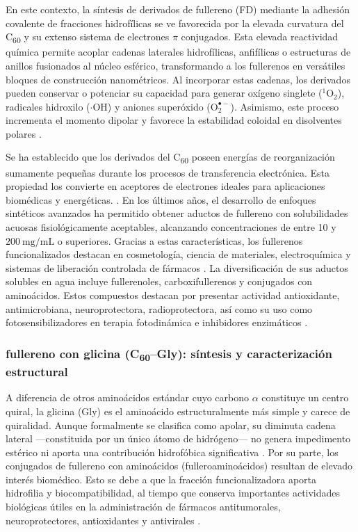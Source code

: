 En este contexto, la síntesis de derivados de fullereno (FD) mediante la adhesión covalente de fracciones hidrofílicas se ve favorecida por la elevada curvatura del C\textsubscript{60} y su extenso sistema de electrones $\pi$ conjugados. Esta elevada reactividad química permite acoplar cadenas laterales hidrofílicas, anfifílicas o estructuras de anillos fusionados al núcleo esférico, transformando a los fullerenos en versátiles bloques de construcción nanométricos. Al incorporar estas cadenas, los derivados pueden conservar o potenciar su capacidad para generar oxígeno singlete ($^1\text{O}_2$), radicales hidroxilo ($\cdot\text{OH}$) y aniones superóxido ($\text{O}_2^{\bullet-}$). Asimismo, este proceso incrementa el momento dipolar y favorece la estabilidad coloidal en disolventes polares \cite{gaur2021biomedical}.

Se ha establecido que los derivados del C\textsubscript{60} poseen energías de reorganización sumamente pequeñas durante los procesos de transferencia electrónica. Esta propiedad los convierte en aceptores de electrones ideales para aplicaciones biomédicas y energéticas. \cite{sharoyko2021biologically, nelson2022principios}. En los últimos años, el desarrollo de enfoques sintéticos avanzados ha permitido obtener aductos de fullereno con solubilidades acuosas fisiológicamente aceptables, alcanzando concentraciones de entre 10 y $200\ \text{mg/mL}$ o superiores. %
 Gracias a estas características, los fullerenos funcionalizados destacan en cosmetología, ciencia de materiales, electroquímica y sistemas de liberación controlada de fármacos \cite{andrada2012nanotecnologia, liu2024quantum}. La diversificación de sus aductos solubles en agua incluye fullerenoles, carboxifullerenos y conjugados con aminoácidos. Estos compuestos destacan por presentar actividad antioxidante, antimicrobiana, neuroprotectora, radioprotectora, así como su uso como fotosensibilizadores en terapia fotodinámica e inhibidores enzimáticos \cite{marforio2021dissecting}.

\subsubsection{fullereno con glicina (C\textsubscript{60}--Gly): síntesis y caracterización estructural}

A diferencia de otros aminoácidos estándar cuyo carbono $\alpha$ constituye un centro quiral, la glicina (Gly) es el aminoácido estructuralmente más simple y carece de quiralidad. Aunque formalmente se clasifica como apolar, su diminuta cadena lateral —constituida por un único átomo de hidrógeno— no genera impedimento estérico ni aporta una contribución hidrofóbica significativa \cite{bolshakova2023facile}. Por su parte, los conjugados de fullereno con aminoácidos (fulleroaminoácidos) resultan de elevado interés biomédico. Esto se debe a que la fracción funcionalizadora aporta hidrofilia y biocompatibilidad, al tiempo que conserva importantes actividades biológicas útiles en la administración de fármacos antitumorales, neuroprotectores, antioxidantes y antivirales \cite{jiang2015synthesis}.

